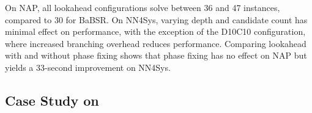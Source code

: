 \documentclass{article}
\begin{document}
\begin{table}[t]
    \centering
    \setlength{\tabcolsep}{7pt}
    \caption{Ablation studies on \marabou with BaBSR. D denotes lookahead depth, C denotes preselected candidates, PF denotes phase fixing.}
    \label{tab:marabou_ablation}
\end{table}

On NAP, all lookahead configurations solve between 36 and 47 instances, compared to 30 for BaBSR. On NN4Sys, varying depth and candidate count has minimal effect on performance, with the exception of the D10C10 configuration, where increased branching overhead reduces performance. Comparing lookahead with and without phase fixing shows that phase fixing has no effect on NAP but yields a 33-second improvement on NN4Sys.

\subsection{Case Study on \abcrown}
\end{document}
